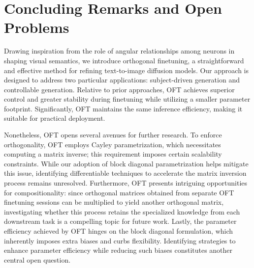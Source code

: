 \section{Concluding Remarks and Open Problems}

Drawing inspiration from the role of angular relationships among neurons in shaping visual semantics, we introduce orthogonal finetuning, a straightforward and effective method for refining text-to-image diffusion models. Our approach is designed to address two particular applications: subject-driven generation and controllable generation. Relative to prior approaches, OFT achieves superior control and greater stability during finetuning while utilizing a smaller parameter footprint. Significantly, OFT maintains the same inference efficiency, making it suitable for practical deployment.

Nonetheless, OFT opens several avenues for further research. To enforce orthogonality, OFT employs Cayley parametrization, which necessitates computing a matrix inverse; this requirement imposes certain scalability constraints. While our adoption of block diagonal parametrization helps mitigate this issue, identifying differentiable techniques to accelerate the matrix inversion process remains unresolved. Furthermore, OFT presents intriguing opportunities for compositionality: since orthogonal matrices obtained from separate OFT finetuning sessions can be multiplied to yield another orthogonal matrix, investigating whether this process retains the specialized knowledge from each downstream task is a compelling topic for future work. Lastly, the parameter efficiency achieved by OFT hinges on the block diagonal formulation, which inherently imposes extra biases and curbs flexibility. Identifying strategies to enhance parameter efficiency while reducing such biases constitutes another central open question.